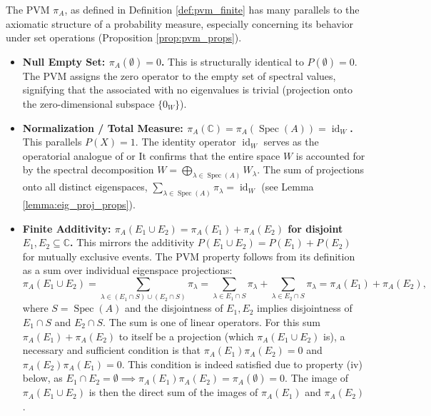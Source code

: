 The PVM $\pi_A$, as defined in Definition \ref{def:pvm_finite} has many parallels to the axiomatic structure of a probability measure, especially concerning its behavior under set operations (Proposition \ref{prop:pvm_props}).

\begin{itemize}
    \item[(i)] \textbf{Null Empty Set: $\pi_A(\emptyset) = 0$.}
    This is structurally identical to $P(\emptyset)=0$. The PVM assigns the zero operator to the empty set of spectral values, signifying that the  associated with no eigenvalues is trivial (projection onto the zero-dimensional subspace $\{0_W\}$).

    \item[(ii)] \textbf{Normalization / Total Measure: $\pi_A(\mathbb{C}) = \pi_A(\operatorname{Spec}(A)) = \operatorname{id}_W$.}
    This parallels $P(X)=1$. The identity operator $\operatorname{id}_W$ serves as the operatorial analogue of  or  It confirms that the entire space $W$ is accounted for by the spectral decomposition $W = \bigoplus_{\lambda \in \operatorname{Spec}(A)} W_{\lambda}$. The sum of projections onto all distinct eigenspaces, $\sum_{\lambda \in \operatorname{Spec}(A)} \pi_\lambda = \operatorname{id}_W$ (see Lemma \ref{lemma:eig_proj_props}).

    \item[(iii)] \textbf{Finite Additivity: $\pi_A(E_1 \cup E_2) = \pi_A(E_1) + \pi_A(E_2)$ for disjoint $E_1, E_2 \subseteq \mathbb{C}$.}
    This mirrors the additivity $P(E_1 \cup E_2) = P(E_1) + P(E_2)$ for mutually exclusive events. The PVM property follows from its definition as a sum over individual eigenspace projections:
    \[ \pi_A(E_1 \cup E_2) = \sum_{\lambda \in (E_1 \cap S) \cup (E_2 \cap S)} \pi_\lambda = \sum_{\lambda \in E_1 \cap S} \pi_\lambda + \sum_{\lambda \in E_2 \cap S} \pi_\lambda = \pi_A(E_1) + \pi_A(E_2), \]
    where $S = \operatorname{Spec}(A)$ and the disjointness of $E_1, E_2$ implies disjointness of $E_1 \cap S$ and $E_2 \cap S$. The sum is one of linear operators. For this sum $\pi_A(E_1) + \pi_A(E_2)$ to itself be a projection (which $\pi_A(E_1 \cup E_2)$ is), a necessary and sufficient condition is that $\pi_A(E_1)\pi_A(E_2) = 0$ and $\pi_A(E_2)\pi_A(E_1) = 0$. This condition is indeed satisfied due to property (iv) below, as $E_1 \cap E_2 = \emptyset \implies \pi_A(E_1)\pi_A(E_2) = \pi_A(\emptyset) = 0$. The image of $\pi_A(E_1 \cup E_2)$ is then the direct sum of the images of $\pi_A(E_1)$ and $\pi_A(E_2)$.
\end{itemize}

